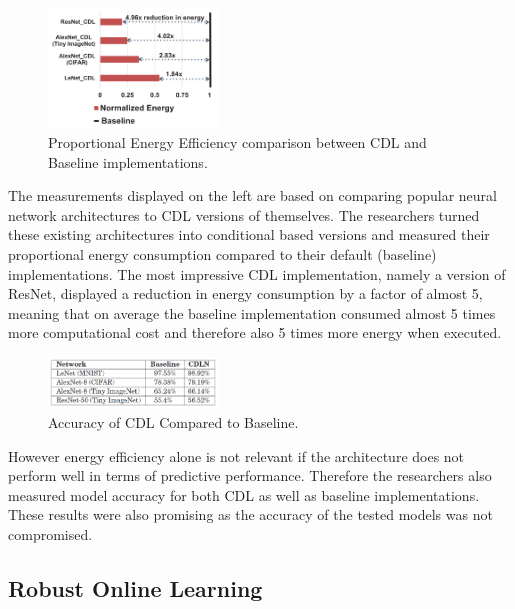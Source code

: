 \begin{figure}
  \centering 
  \includegraphics[width=0.40\textwidth]{PICs/CDL-energy-efficiency.png}
  \caption{Proportional Energy Efficiency comparison between \acs{CDL} and Baseline implementations.}
\end{figure}

The measurements displayed on the left are based on comparing popular neural network architectures to \acs{CDL} versions of themselves. The researchers turned these existing architectures into conditional based versions and measured their proportional energy consumption compared to their default (baseline) implementations.
The most impressive \acs{CDL} implementation, namely a version of ResNet, displayed a reduction in energy consumption by a factor of almost 5, meaning that on average the baseline implementation consumed almost 5 times more computational cost and therefore also 5 times more energy when executed. \linebreak


\begin{figure}
  \centering 
  \includegraphics[width=0.40\textwidth]{PICs/accuracy-comparison-between-CDL-and-vanilla-ANNs.png}
  \caption{Accuracy of \acs{CDL} Compared to Baseline.}
  \label{accuracy-of-CDLNs}
\end{figure}

However energy efficiency alone is not relevant if the architecture does not perform well in terms of predictive performance. 
Therefore the researchers also measured 
model accuracy for both \acs{CDL} as well as baseline implementations.
These results were also promising as the accuracy of the tested models was not compromised.
 


\subsection{Robust Online Learning}

